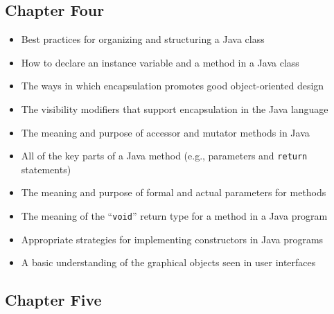 \vspace*{-.25in}
\subsection*{Chapter Four}
\vspace*{-.1in}

\begin{itemize}

  \itemsep -.015in
  \item Best practices for organizing and structuring a Java class
  \item How to declare an instance variable and a method in a Java class
  \item The ways in which encapsulation promotes good object-oriented design
  \item The visibility modifiers that support encapsulation in the Java language
  \item The meaning and purpose of accessor and mutator methods in Java
  \item All of the key parts of a Java method (e.g., parameters and {\tt return} statements)
  \item The meaning and purpose of formal and actual parameters for methods
  \item The meaning of the ``{\tt void}'' return type for a method in a Java program
  \item Appropriate strategies for implementing constructors in Java programs
  \item A basic understanding of the graphical objects seen in user interfaces

\end{itemize}

\vspace*{-.25in}
\subsection*{Chapter Five}
\vspace*{-.1in}

